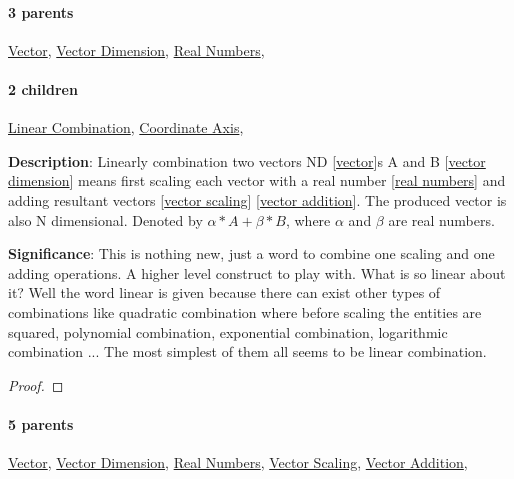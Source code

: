 \documentclass[../main.tex]{subfiles}
\begin{document}
\paragraph{3 parents} \hyperref[statement:Vector]{Vector}, \hyperref[statement:Vector Dimension]{Vector Dimension}, \hyperref[statement:Real Numbers]{Real Numbers}, 
\paragraph{2 children} \hyperref[statement:Linear Combination]{Linear Combination}, \hyperref[statement:Coordinate Axis]{Coordinate Axis}, 



\begin{statement}
\label{statement:Linear Combination}\hspace*{0pt}\par
\end{statement}
\textbf{Description}:
  Linearly combination two vectors ND [\hyperref[statement:Vector]{vector}]s A and B [\hyperref[statement:Vector Dimension]{vector dimension}] means first scaling each vector with a real number [\hyperref[statement:Real Numbers]{real numbers}] and adding resultant vectors [\hyperref[statement:Vector Scaling]{vector scaling}] [\hyperref[statement:Vector Addition]{vector addition}].
  The produced vector is also N dimensional.
  Denoted by $ \alpha * A + \beta * B $, where $\alpha$ and $\beta$ are real numbers.
\par
{\color{magenta} \textbf{Significance}:
  This is nothing new, just a word to combine one scaling and one adding operations.
  A higher level construct to play with.
  What is so linear about it?
  Well the word linear is given because there can exist other types of combinations like quadratic combination where before scaling the entities are squared, polynomial combination, exponential combination, logarithmic combination ...
  The most simplest of them all seems to be linear combination.
\par}
\begin{proof}
\proofbydefinition
\end{proof}\par
\paragraph{5 parents} \hyperref[statement:Vector]{Vector}, \hyperref[statement:Vector Dimension]{Vector Dimension}, \hyperref[statement:Real Numbers]{Real Numbers}, \hyperref[statement:Vector Scaling]{Vector Scaling}, \hyperref[statement:Vector Addition]{Vector Addition}, 
\end{document}
